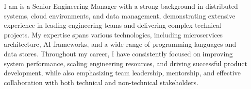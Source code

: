 I am is a Senior Engineering Manager with a strong background in distributed
systems, cloud environments, and data management, demonstrating extensive experience
in leading engineering teams and delivering complex technical projects. My expertise
spans various technologies, including microservices architecture, AI frameworks, and
a wide range of programming languages and data stores. Throughout my career, I have
consistently focused on improving system performance, scaling engineering resources,
and driving successful product development, while also emphasizing team leadership,
mentorship, and effective collaboration with both technical and non-technical stakeholders.
